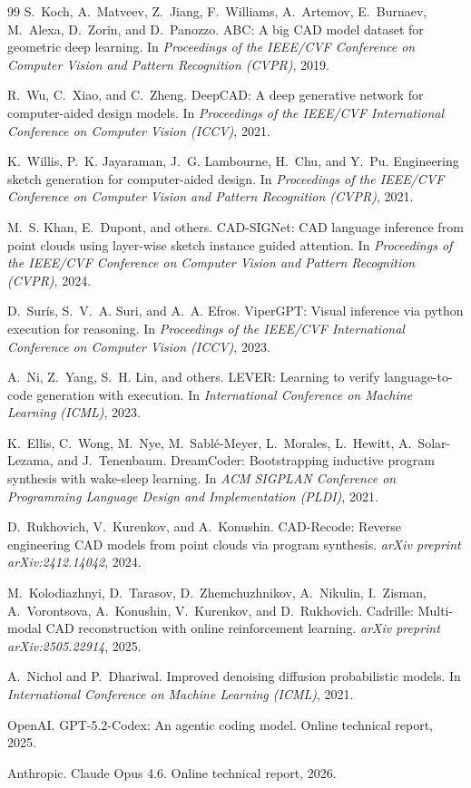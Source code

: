 {\begin{thebibliography}{99}
S.~Koch, A.~Matveev, Z.~Jiang,
F.~Williams, A.~Artemov, E.~Burnaev,
M.~Alexa, D.~Zorin, and D.~Panozzo.
ABC: A big CAD model dataset for geometric deep learning.
In \emph{Proceedings of the IEEE/CVF Conference on Computer Vision
and Pattern Recognition (CVPR)}, 2019.

R.~Wu, C.~Xiao, and C.~Zheng.
DeepCAD: A deep generative network for computer-aided design models.
In \emph{Proceedings of the IEEE/CVF International Conference on
Computer Vision (ICCV)}, 2021.

K.~Willis, P.~K. Jayaraman,
J.~G. Lambourne, H.~Chu, and Y.~Pu.
Engineering sketch generation for computer-aided design.
In \emph{Proceedings of the IEEE/CVF Conference on Computer Vision
and Pattern Recognition (CVPR)}, 2021.

M.~S. Khan, E.~Dupont, and others.
CAD-SIGNet: CAD language inference from point clouds using
layer-wise sketch instance guided attention.
In \emph{Proceedings of the IEEE/CVF Conference on Computer Vision
and Pattern Recognition (CVPR)}, 2024.

D.~Sur\'is, S.~V.~A. Suri, and A.~A. Efros.
ViperGPT: Visual inference via python execution for reasoning.
In \emph{Proceedings of the IEEE/CVF International Conference on
Computer Vision (ICCV)}, 2023.

A.~Ni, Z.~Yang, S.~H. Lin, and others.
LEVER: Learning to verify language-to-code generation with execution.
In \emph{International Conference on Machine Learning (ICML)}, 2023.

K.~Ellis, C.~Wong, M.~Nye, M.~Sabl{\'e}-Meyer,
L.~Morales, L.~Hewitt, A.~Solar-Lezama,
and J.~Tenenbaum.
DreamCoder: Bootstrapping inductive program synthesis with wake-sleep learning.
In \emph{ACM SIGPLAN Conference on Programming Language Design and Implementation (PLDI)}, 2021.

D.~Rukhovich, V.~Kurenkov, and A.~Konushin.
CAD-Recode: Reverse engineering CAD models from point clouds via program synthesis.
\emph{arXiv preprint arXiv:2412.14042}, 2024.

M.~Kolodiazhnyi, D.~Tarasov, D.~Zhemchuzhnikov,
A.~Nikulin, I.~Zisman, A.~Vorontsova,
A.~Konushin, V.~Kurenkov, and D.~Rukhovich.
Cadrille: Multi-modal CAD reconstruction with online reinforcement learning.
\emph{arXiv preprint arXiv:2505.22914}, 2025.

A.~Nichol and P.~Dhariwal.
Improved denoising diffusion probabilistic models.
In \emph{International Conference on Machine Learning (ICML)}, 2021.

OpenAI.
GPT-5.2-Codex: An agentic coding model.
Online technical report, 2025.

Anthropic.
Claude Opus 4.6.
Online technical report, 2026.


\end{thebibliography}
}
